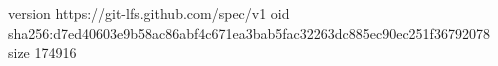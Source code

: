 version https://git-lfs.github.com/spec/v1
oid sha256:d7ed40603e9b58ac86abf4c671ea3bab5fac32263dc885ec90ec251f36792078
size 174916
